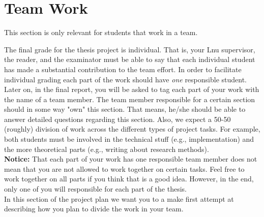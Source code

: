 \documentclass[12pt]{article}
\begin{document}
\section*{Team Work}
This section is only relevant for students that work in a team.

The final grade for the thesis project is individual. That is, your Lnu supervisor, the reader, and the examinator must be able to say that each individual student has made a substantial contribution to the team effort. In order to facilitate individual grading  each part of the work should have \emph{one} responsible student. Later on, in the final report, you will be asked to tag each part of your work with the name of a team member. The team member responsible for a certain section should in some way "own" this section. That means, he/she should be able to answer detailed questions regarding this section. Also, we expect a 50-50 (roughly) division of work across the different types of project tasks. For example, both students must be involved in the technical stuff (e.g., implementation) and the more theoretical parts (e.g., writing about research methods).\\

\noindent
\textbf{Notice:} That each part of your work has one responsible team member does not mean that you are not allowed to work together on certain tasks. Feel free to work together on all parts if you think that is a good idea. However, in the end, only one of you will responsible for each part of the thesis.\\

\noindent
In this section of the project plan we want you to a make first attempt at describing how you plan to divide the work in your team. 



\newpage


\end{document}
